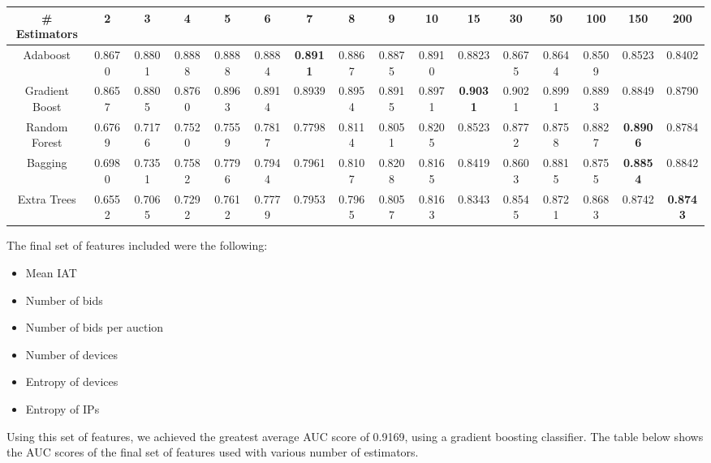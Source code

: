 \documentclass{article} %
\begin{document}
\begin{adjustbox}{width=\textwidth,totalheight=\textheight,keepaspectratio}
\begin{tabular}{c | c c c c c c c c c c c c c c c}
\# Estimators & 2 & 3 & 4 & 5 & 6 & 7 & 8 & 9 & 10 & 15 & 30 & 50 & 100 & 150 & 200\\
\hline
Adaboost & 0.8670 & 0.8801 & 0.8888 & 0.8888 & 0.8884 & \textbf{0.8911} & 0.8867 & 0.8875 & 0.8910 & 0.8823 & 0.8675 & 0.8644 & 0.8509 & 0.8523 & 0.8402\\
Gradient Boost & 0.8657 & 0.8805 & 0.8760 & 0.8963 & 0.8914 & 0.8939 & 0.8954 & 0.8915 & 0.8971 & \textbf{0.9031} & 0.9021 & 0.8991 & 0.8893 & 0.8849 & 0.8790\\
Random Forest & 0.6769 & 0.7176 & 0.7520 & 0.7559 & 0.7817 & 0.7798 & 0.8114 & 0.8051 & 0.8205 & 0.8523 & 0.8772 & 0.8758 & 0.8827 & \textbf{0.8906} & 0.8784\\
Bagging & 0.6980 & 0.7351 & 0.7582 & 0.7796 & 0.7944 & 0.7961 & 0.8107 & 0.8208 & 0.8165 & 0.8419 & 0.8603 & 0.8815 & 0.8755 & \textbf{0.8854} & 0.8842\\
Extra Trees & 0.6552 & 0.7065 & 0.7292 & 0.7612 & 0.7779 & 0.7953 & 0.7965 & 0.8057 & 0.8163 & 0.8343 & 0.8545 & 0.8721 & 0.8683 & 0.8742 & \textbf{0.8743}
\end{tabular}
\end{adjustbox}


The final set of features included were the following:

\begin{itemize}
\item Mean IAT
\item Number of bids
\item Number of bids per auction
\item Number of devices
\item Entropy of devices
\item Entropy of IPs
\end{itemize}

Using this set of features, we achieved the greatest average AUC score of
0.9169, using a gradient boosting classifier. The table below shows the AUC scores of the final set of features used with various number of estimators.
\end{document}
